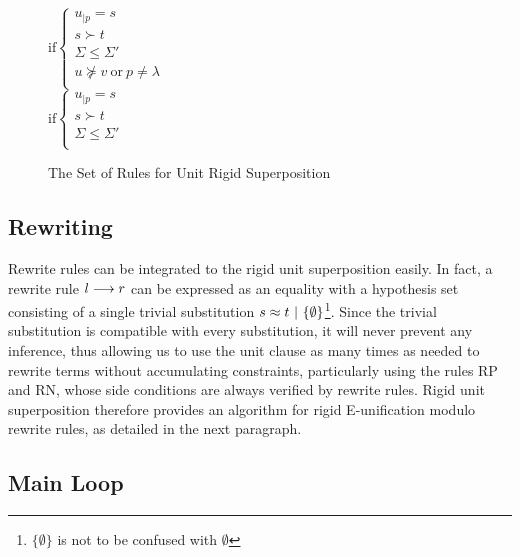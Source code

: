 \begin{figure}[htb]
\begin{center}
\doubleLine{}
\DP
$\text{if} \left\{\begin{array}{l}
u_{|p} = s\\
s \succ t\\
\Sigma \leq \Sigma'\\
u \not\succeq v ~ \text{or} ~ p \neq \lambda\\
\end{array}\right.$\\[12pt]

\doubleLine{}
\DP
$\text{if} \left\{\begin{array}{l}
u_{|p} = s\\
s \succ t\\
\Sigma \leq \Sigma'\\
\end{array}\right.$
\caption{The Set of Rules for Unit Rigid Superposition}
\label{fig:unit-sup-rules}
\end{center}
\end{figure}

\subsection{Rewriting}

Rewrite rules can be integrated to the rigid unit superposition easily. In fact,
a rewrite rule $l\longrightarrow{}r$ can be expressed as an equality with a hypothesis set
consisting of a single trivial substitution
$s\approx{}t ~|~ \{\emptyset\}$\footnote{$\{\emptyset\}$ is not to be confused with $\emptyset$}.
Since the trivial substitution is compatible
with every substitution, it will never prevent any inference, thus allowing us
to use the unit clause as many times as needed to rewrite terms without
accumulating constraints, particularly using the rules RP and RN, whose side
conditions are always verified by rewrite rules. Rigid unit superposition
therefore provides an algorithm for rigid E-unification modulo rewrite rules,
as detailed in the next paragraph.

\subsection{Main Loop}

